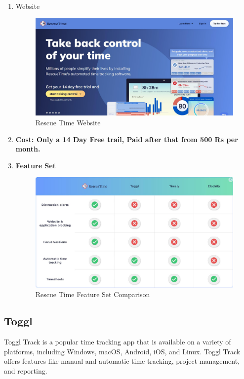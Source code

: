 \documentclass[openany]{report}
\begin{document}
\begin{enumerate}
    \item Website
          \begin{figure}[H]
              \centering
              \includegraphics[width=.95\textwidth]{rescuetime.jpg}
              \caption{Rescue Time Website}
          \end{figure}

    \item \textbf{Cost: Only a 14 Day Free trail, Paid after that from 500 Rs per month.}\\

    \item \textbf{Feature Set}
          \begin{figure}[H]
              \centering
              \includegraphics[width=.95\textwidth]{rescuetime featureset.jpg}
              \caption{Rescue Time Feature Set Comparison}
          \end{figure}
\end{enumerate}

\subsection{Toggl}
Toggl Track is a popular time tracking app that is available on a variety of platforms, including Windows, macOS, Android, iOS, and Linux. Toggl Track offers features like manual and automatic time tracking, project management, and reporting.
\end{document}
